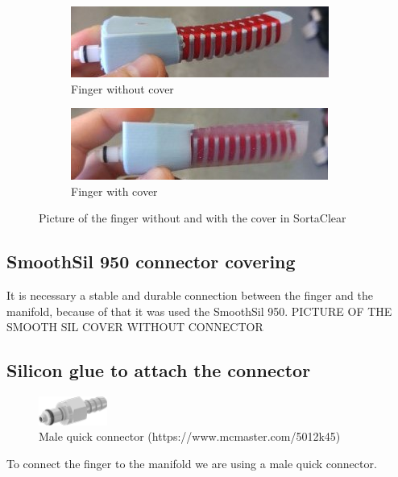 \documentclass{article}
\begin{document}
\begin{figure}[h]
	\begin{subfigure}{0.5\textwidth}
		\includegraphics[width=1\linewidth, height=0.3\linewidth]{Pictures/fingerOnToroidal/WithoutCover.jpg} 
		\caption{Finger without cover}
		\label{fig:withoutCover}
	\end{subfigure}
	\hfill
	\begin{subfigure}{0.5\textwidth}
		\includegraphics[width=1\linewidth, height=0.3\linewidth]{Pictures/fingerOnToroidal/WithCover.jpg}
		\caption{Finger with cover}
		\label{fig:withCover}
	\end{subfigure}
 
	\caption{Picture of the finger without and with the cover in SortaClear}
	\label{fig:external}
\end{figure}


\subsection{SmoothSil 950 connector covering}
It is necessary a stable and durable connection between the finger and the manifold, because of that it was used the SmoothSil 950.
PICTURE OF THE SMOOTH SIL COVER WITHOUT CONNECTOR

\subsection{Silicon glue to attach the connector}
\begin{figure}
\centering
    \includegraphics[width=0.2\textwidth]{Pictures/fingerOnToroidal/MaleQuickConnector.png}
    \caption{Male quick connector (https://www.mcmaster.com/5012k45)}
    \label{fig:MaleQuickConnector}
\end{figure}
To connect the finger to the manifold we are using a male quick connector.  
\end{document}
